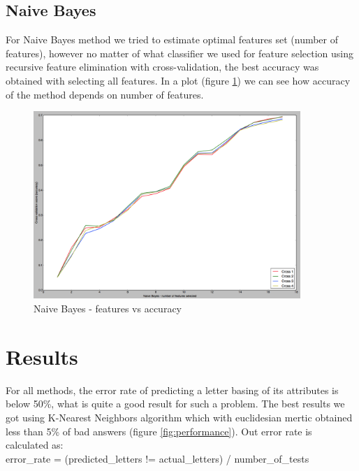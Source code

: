 \subsection{Naive Bayes}
For Naive Bayes method we tried to estimate optimal features set (number of features), however no matter of what
classifier we used for feature selection using recursive feature elimination with cross-validation, the best accuracy was
obtained with selecting all features. In a plot (figure \ref{fig:NB_feature_selection}) we can see how accuracy of the method 
depends on number of features.
\begin{figure}[!tbh]
	\centering
	\includegraphics[width=0.9\textwidth]{figures/NB_feature_selection}
	\caption{Naive Bayes - features vs accuracy}
	\label{fig:NB_feature_selection}
\end{figure}
\section{Results}
For all methods, the error rate of predicting a letter basing of its attributes is below 50\%, what is quite a good result for
such a problem. The best results we got using K-Nearest Neighbors algorithm which with euclidesian mertic obtained less
than 5\% of bad answers (figure \ref{fig:performance}). Out error rate is calculated as: \\
error\_rate = (predicted\_letters != actual\_letters) / number\_of\_tests

